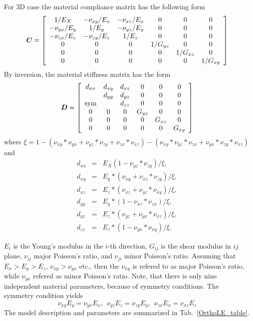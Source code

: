 \documentclass[a4paper]{article}
\newcommand{\mbf}[1]{\mbox{\boldmath$#1$}}
\begin{document}
For 3D case the material compliance matrix has the following form
\begin{equation}
  \mbf{C}=\left[\begin{array}{cccccc}
1/E_X & -\nu_{xy}/E_x& -\nu_{xz}/E_x& 0& 0&0\\
-\nu_{yx}/E_y & 1/E_y& -\nu_{yz}/E_y& 0& 0&0\\
-\nu_{zx}/E_z & -\nu_{zy}/E_z& 1/E_z& 0& 0&0\\
0 & 0 & 0 & 1/G_{yz} & 0 & 0\\
0 & 0 & 0 & 0 & 1/G_{xz} & 0\\
0 & 0 & 0 & 0 & 0 & 1/G_{xy}
 \end{array}\right]
\end{equation}
By inversion, the material stiffness matrix has the form
\begin{equation}
  \mbf{D}=\left[\begin{array}{cccccc}
d_{xx} & d_{xy} & d_{xz} & 0 & 0 & 0\\
& d_{yy} & d_{yz} & 0 & 0 & 0\\
\rm {sym} & & d_{zz} & 0 & 0 & 0\\
0 & 0 & 0 & G_{yz} & 0 & 0\\
0 & 0 & 0 & 0 & G_{xz} & 0\\
0 & 0 & 0 & 0 & 0 & G_{xy}
 \end{array}\right]
\end{equation}
where $\xi=1-(\nu_{xy}*\nu_{yx}+\nu_{yz}*\nu_{zy}+\nu_{zx}*\nu_{xz})-(\nu_{xy}*\nu_{yz}*\nu_{zx}+\nu_{yx}*\nu_{zy}*\nu_{xz})$ and
\begin{eqnarray}
  d_{xx}&=&E_X(1-\nu_{yz}*\nu_{zy})/\xi,\\
  d_{xy}&=&E_y*(\nu_{xy}+\nu_{xz}*\nu_{zy})/\xi,\\
  d_{xz}&=&E_z*(\nu_{xz}+\nu_{yz}*\nu_{xy})/\xi,\\
  d_{yy}&=&E_y*(1-\nu_{xz}*\nu_{zx})/\xi,\\
  d_{yz}&=&E_z*(\nu_{yz}+\nu_{yx}*\nu_{xz})/\xi,\\
  d_{zz}&=&E_z*(1-\nu_{yx}*\nu_{xy})/\xi.
\end{eqnarray}


 $E_i$ is the Young's modulus in the $i$-th direction, $G_{ij}$ is the shear modulus in $ij$ plane, $\nu_{ij}$ major Poisson's ratio, and $\nu_{ji}$ minor Poisson's ratio. Assuming that $E_x>E_y>E_z$, $\nu_{xy} > \nu_{yx}$ etc., then the $\nu_{xy}$ is refered to as major Poisson's ratio, while $\nu_{yx}$ refered as minor Poisson's ratio.
Note, that there is only nine independent material parameters,
because of symmetry conditions. The symmetry condition yields
$$\nu_{xy}E_y=\nu_{yx}E_x,\ \ \nu_{yz}E_z=\nu_{zy}E_y,\ \ \nu_{zx}E_x=\nu_{xz}E_z$$
The model description and parameters are summarized
in Tab.~\ref{OrthoLE_table}.
\end{document}
